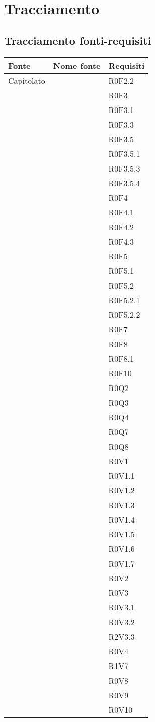 \documentclass[AnalisiDeiRequisiti.tex]{subfiles}
\begin{document}
\section{Tracciamento}
\subsection{Tracciamento fonti-requisiti}

\label{table:Tabella di tracciamento fonti-requisiti}
\begin{longtable}[H]{|p{2cm}|p{5cm}|p{5cm}|}
	\hline
	\rowcolor[HTML]{38FFF8} 
	\textbf{Fonte} & \textbf{Nome fonte} & \textbf{Requisiti} \\ \hline
	\endhead
	Capitolato & & R0F2.2 \\
	& & R0F3 \\
	& & R0F3.1 \\
	& & R0F3.3 \\
	& & R0F3.5 \\
	& & R0F3.5.1 \\
	& & R0F3.5.3 \\
	& & R0F3.5.4 \\
	& & R0F4 \\
	& & R0F4.1 \\
	& & R0F4.2 \\
	& & R0F4.3 \\
	& & R0F5 \\
	& & R0F5.1 \\
	& & R0F5.2 \\
	& & R0F5.2.1 \\
	& & R0F5.2.2 \\
	& & R0F7 \\
	& & R0F8 \\
	& & R0F8.1 \\
	& & R0F10 \\
	& & R0Q2 \\
	& & R0Q3 \\
	& & R0Q4 \\
	& & R0Q7 \\
	& & R0Q8 \\
	& & R0V1 \\
	& & R0V1.1 \\
	& & R0V1.2 \\
	& & R0V1.3 \\
	& & R0V1.4 \\
	& & R0V1.5 \\
	& & R0V1.6 \\
	& & R0V1.7 \\
	& & R0V2 \\
	& & R0V3 \\
	& & R0V3.1 \\
	& & R0V3.2 \\
	& & R2V3.3 \\
	& & R0V4 \\
	& & R1V7 \\
	& & R0V8 \\
	& & R0V9 \\
	& & R0V10 \\ \hline
	

\end{longtable}
\end{document}
